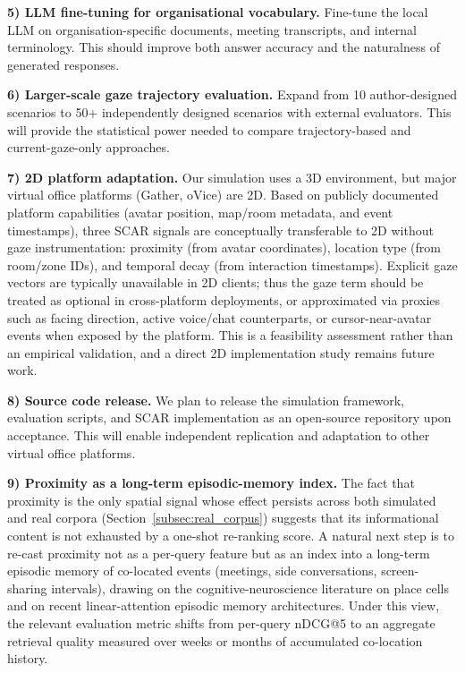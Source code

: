 \documentclass[journal]{IEEEtran}
\begin{document}
\textbf{5) LLM fine-tuning for organisational vocabulary.}
Fine-tune the local LLM on organisation-specific documents, meeting transcripts, and internal terminology.
This should improve both answer accuracy and the naturalness of generated responses.

\textbf{6) Larger-scale gaze trajectory evaluation.}
Expand from 10 author-designed scenarios to 50+ independently designed scenarios with external evaluators.
This will provide the statistical power needed to compare trajectory-based and current-gaze-only approaches.

\textbf{7) 2D platform adaptation.}
Our simulation uses a 3D environment, but major virtual office platforms (Gather, oVice) are 2D.  Based on publicly documented platform capabilities (avatar position, map/room metadata, and event timestamps), three SCAR signals are conceptually transferable to 2D without gaze instrumentation: proximity (from avatar coordinates), location type (from room/zone IDs), and temporal decay (from interaction timestamps). Explicit gaze vectors are typically unavailable in 2D clients; thus the gaze term should be treated as optional in cross-platform deployments, or approximated via proxies such as facing direction, active voice/chat counterparts, or cursor-near-avatar events when exposed by the platform.  This is a feasibility assessment rather than an empirical validation, and a direct 2D implementation study remains future work.

\textbf{8) Source code release.}
We plan to release the simulation framework, evaluation scripts, and SCAR implementation as an open-source repository upon acceptance.  This will enable independent replication and adaptation to other virtual office platforms.

\textbf{9) Proximity as a long-term episodic-memory index.}
The fact that proximity is the only spatial signal whose effect persists across
both simulated and real corpora (Section~\ref{subsec:real_corpus}) suggests
that its informational content is not exhausted by a one-shot re-ranking
score. A natural next step is to re-cast proximity not as a per-query feature
but as an index into a long-term episodic memory of co-located events
(meetings, side conversations, screen-sharing intervals), drawing on the
cognitive-neuroscience literature on place cells and on recent linear-attention
episodic memory architectures. Under this view, the relevant evaluation
metric shifts from per-query nDCG@5 to an aggregate retrieval quality measured
over weeks or months of accumulated co-location history.
\end{document}
